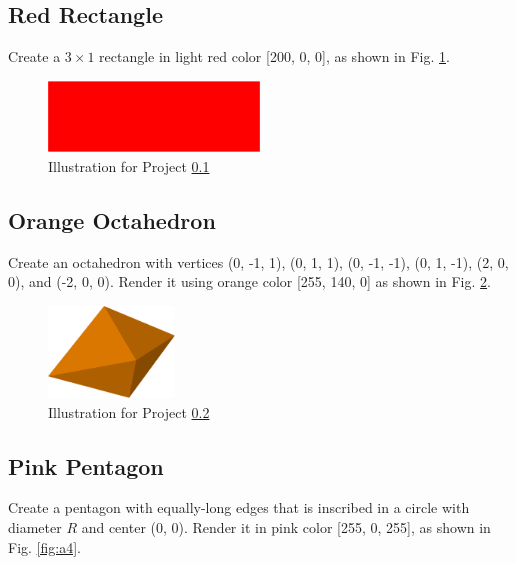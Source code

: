 \subsection{Red Rectangle}\label{2.2}
Create a $3 \times 1$ rectangle in light
red color [200, 0, 0], as shown in Fig. \ref{fig:a2}.\\

\begin{figure}[!ht]
\begin{center}
\includegraphics[width=0.5\textwidth]{img/a2-red-rectangle.png}
\end{center}
\vspace{-2mm}
\caption{Illustration for Project \ref{2.2}}
\label{fig:a2}
\vspace{-0cm}
\end{figure}


\subsection{Orange Octahedron}\label{2.3}
Create an octahedron with vertices 
(0, -1, 1), (0, 1, 1), (0, -1, -1), (0, 1, -1), (2, 0, 0), and (-2, 0, 0). 
Render it using orange color [255, 140, 0]
as shown in Fig. \ref{fig:a3}.

\begin{figure}[!ht]
\begin{center}
\includegraphics[width=0.3\textwidth]{img/a3-orange-octahedron.png}
\end{center}
\vspace{-2mm}
\caption{Illustration for Project \ref{2.3}}
\label{fig:a3}
\end{figure}




\subsection{Pink Pentagon}\label{2.4}
Create a pentagon with equally-long edges that is inscribed 
in a circle with diameter $R$ and center (0, 0). Render it in pink color [255, 0, 255],
as shown in Fig. \ref{fig:a4}.
\newpage

